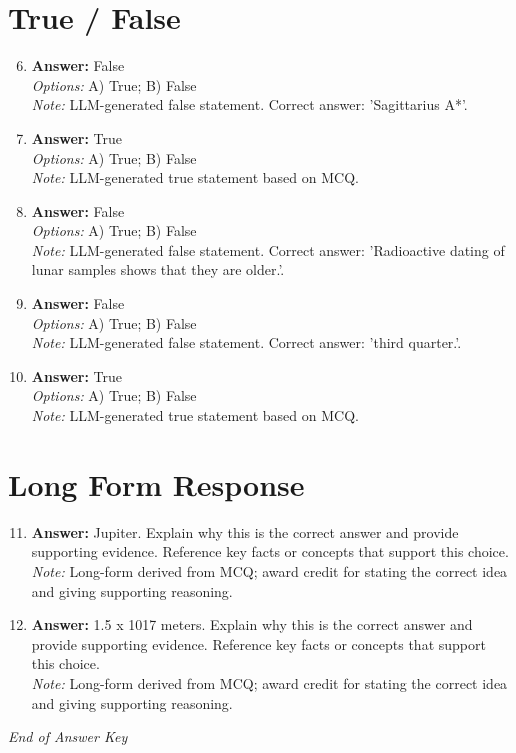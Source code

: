\documentclass[12pt]{article}
\begin{document}
\section*{True / False}
\begin{enumerate}[label=\arabic*.]
\setcounter{enumi}{5}
\item \textbf{Answer:} False
\\ \textit{Options:} A) True; B) False
\\ \textit{Note:} LLM-generated false statement. Correct answer: 'Sagittarius A*'.
\item \textbf{Answer:} True
\\ \textit{Options:} A) True; B) False
\\ \textit{Note:} LLM-generated true statement based on MCQ.
\item \textbf{Answer:} False
\\ \textit{Options:} A) True; B) False
\\ \textit{Note:} LLM-generated false statement. Correct answer: 'Radioactive dating of lunar samples shows that they are older.'.
\item \textbf{Answer:} False
\\ \textit{Options:} A) True; B) False
\\ \textit{Note:} LLM-generated false statement. Correct answer: 'third quarter.'.
\item \textbf{Answer:} True
\\ \textit{Options:} A) True; B) False
\\ \textit{Note:} LLM-generated true statement based on MCQ.
\end{enumerate}

\section*{Long Form Response}
\begin{enumerate}[label=\arabic*.]
\setcounter{enumi}{10}
\item \textbf{Answer:} Jupiter. Explain why this is the correct answer and provide supporting evidence. Reference key facts or concepts that support this choice.
\\ \textit{Note:} Long-form derived from MCQ; award credit for stating the correct idea and giving supporting reasoning.
\item \textbf{Answer:} 1.5 x 1017 meters. Explain why this is the correct answer and provide supporting evidence. Reference key facts or concepts that support this choice.
\\ \textit{Note:} Long-form derived from MCQ; award credit for stating the correct idea and giving supporting reasoning.
\end{enumerate}

\vfill
\noindent\textit{End of Answer Key}
\end{document}

